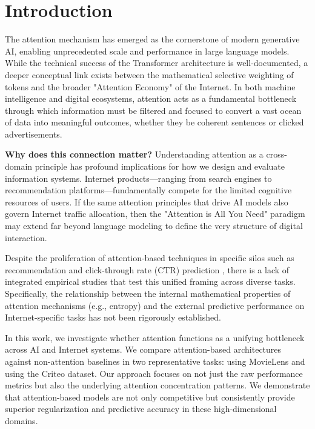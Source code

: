 \section{Introduction}
\label{sec:intro}

The attention mechanism has emerged as the cornerstone of modern generative AI, enabling unprecedented scale and performance in large language models. While the technical success of the Transformer architecture \cite{vaswani2017attention} is well-documented, a deeper conceptual link exists between the mathematical selective weighting of tokens and the broader "Attention Economy" of the Internet. In both machine intelligence and digital ecosystems, attention acts as a fundamental bottleneck through which information must be filtered and focused to convert a vast ocean of data into meaningful outcomes, whether they be coherent sentences or clicked advertisements.

{\bf Why does this connection matter?}
Understanding attention as a cross-domain principle has profound implications for how we design and evaluate information systems. Internet products—ranging from search engines to recommendation platforms—fundamentally compete for the limited cognitive resources of users. If the same attention principles that drive AI models also govern Internet traffic allocation, then the "Attention is All You Need" paradigm may extend far beyond language modeling to define the very structure of digital interaction.

Despite the proliferation of attention-based techniques in specific silos such as recommendation \cite{kang2018self, sun2019bert4rec} and click-through rate (CTR) prediction \cite{zhou2018deep}, there is a lack of integrated empirical studies that test this unified framing across diverse tasks. Specifically, the relationship between the internal mathematical properties of attention mechanisms (e.g., entropy) and the external predictive performance on Internet-specific tasks has not been rigorously established.

In this work, we investigate whether attention functions as a unifying bottleneck across AI and Internet systems. We compare attention-based architectures against non-attention baselines in two representative tasks: \sectask using MovieLens and \ctrtask using the Criteo dataset. Our approach focuses on not just the raw performance metrics but also the underlying attention concentration patterns. We demonstrate that attention-based models are not only competitive but consistently provide superior regularization and predictive accuracy in these high-dimensional domains.

